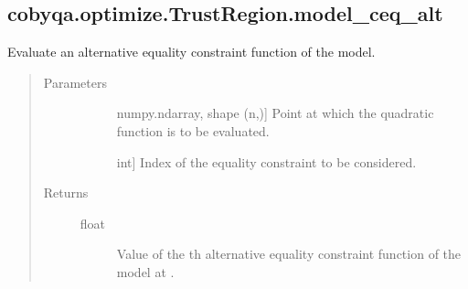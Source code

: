 \documentclass[letterpaper,10pt,english]{sphinxmanual}
\begin{document}
\begin{fulllineitems}
\begin{fulllineitems}
\begin{quote}
\begin{description}
\end{description}\end{quote}

\end{fulllineitems}



\subsection{cobyqa.optimize.TrustRegion.model\_ceq\_alt}
\label{\detokenize{refs/generated/cobyqa.optimize.TrustRegion.model_ceq_alt:cobyqa-optimize-trustregion-model-ceq-alt}}\label{\detokenize{refs/generated/cobyqa.optimize.TrustRegion.model_ceq_alt::doc}}

\begin{fulllineitems}
\label{\detokenize{refs/generated/cobyqa.optimize.TrustRegion.model_ceq_alt:cobyqa.optimize.TrustRegion.model_ceq_alt}}
\sphinxAtStartPar
Evaluate an alternative equality constraint function of the model.
\begin{quote}\begin{description}
\item[{Parameters}] \leavevmode\begin{description}
\item[{}] \leavevmode{[}numpy.ndarray, shape (n,){]}
\sphinxAtStartPar
Point at which the quadratic function is to be evaluated.

\item[{}] \leavevmode{[}int{]}
\sphinxAtStartPar
Index of the equality constraint to be considered.

\end{description}

\item[{Returns}] \leavevmode\begin{description}
\item[{float}] \leavevmode
\sphinxAtStartPar
Value of the \sphinxhyphen{}th alternative equality constraint function of the
model at .

\end{description}

\end{description}\end{quote}


\end{fulllineitems}
\end{fulllineitems}
\end{document}
